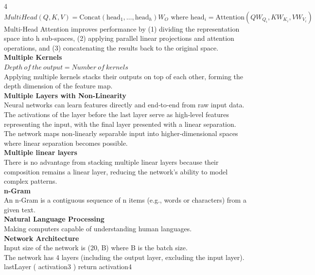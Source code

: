 \documentclass[8pt]{extarticle}
\begin{document}
\begin{multicols}{4}
$MultiHead(Q, K, V) = \text{Concat}(\text{head}_{1}, \dots, \text{head}_{h}) W_{O}\text{ where } \text{head}_{i} = \text{Attention}(Q W_{Q_{i}}, K W_{K_{i}}, V W_{V_{i}})$\\
Multi-Head Attention improves performance by (1) dividing the representation space into h sub‑spaces, (2) applying parallel linear projections and attention operations, and (3) concatenating the results back to the original space.\\
\vspace{2pt}\textbf{Multiple Kernels}\\
$Depth\ of\ the\ output = Number\ of\ kernels$\\
Applying multiple kernels stacks their outputs on top of each other, forming the depth dimension of the feature map.\\
\vspace{2pt}\textbf{Multiple Layers with Non-Linearity}\\
Neural networks can learn features directly and end‑to‑end from raw input data. The activations of the layer before the last layer serve as high‑level features representing the input, with the final layer presented with a linear separation. The network maps non‑linearly separable input into higher‑dimensional spaces where linear separation becomes possible.\\
\vspace{2pt}\textbf{Multiple linear layers}\\
There is no advantage from stacking multiple linear layers because their composition remains a linear layer, reducing the network's ability to model complex patterns.\\
\vspace{2pt}\textbf{n-Gram}\\
An n‑Gram is a contiguous sequence of n items (e.g., words or characters) from a given text.\\
\vspace{2pt}\textbf{Natural Language Processing}\\
Making computers capable of understanding human languages.\\
\vspace{2pt}\textbf{Network Architecture}\\
Input size of the network is (20, B) where B is the batch size.\\
The network has 4 layers (including the output layer, excluding the input layer).\\
lastLayer ( activation3 ) return activation4\\

\end{multicols}
\end{document}

